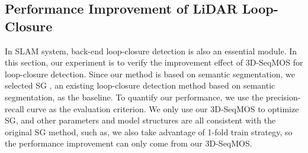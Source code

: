 \documentclass[lettersize,journal]{IEEEtran}
\begin{document}
\subsection{Performance Improvement of LiDAR Loop-Closure}
In SLAM system, back-end loop-closure detection is also an essential module. In this section, our experiment is to verify the improvement effect of 3D-SeqMOS for loop-closure detection. Since our method is based on semantic segmentation, we selected SG \cite{kong2020semantic}, an existing loop-closure detection method based on semantic segmentation, as the baseline. To quantify our performance, we use the precision-recall curve as the evaluation criterion. We only use our 3D-SeqMOS to optimize SG, and other parameters and model structures are all consistent with the original SG method, such as, we also take advantage of 1-fold train strategy, so the performance improvement can only come from our 3D-SeqMOS.
\end{document}

